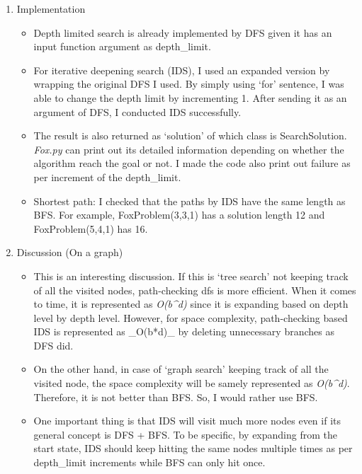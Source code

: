 \documentclass[]{article}
\providecommand{\tightlist}{%
  \setlength{\itemsep}{0pt}\setlength{\parskip}{0pt}}
\begin{document}
\begin{enumerate}
\def\labelenumi{\arabic{enumi}.}
\tightlist
\item
  Implementation

  \begin{itemize}
  \tightlist
  \item
    Depth limited search is already implemented by DFS given it has an
    input function argument as depth\_limit.
  \item
    For iterative deepening search (IDS), I used an expanded version by
    wrapping the original DFS I used. By simply using `for' sentence, I
    was able to change the depth limit by incrementing 1. After sending
    it as an argument of DFS, I conducted IDS successfully.
  \item
    The result is also returned as `solution' of which class is
    SearchSolution. \emph{Fox.py} can print out its detailed information
    depending on whether the algorithm reach the goal or not. I made the
    code also print out failure as per increment of the depth\_limit.
  \item
    Shortest path: I checked that the paths by IDS have the same length
    as BFS. For example, FoxProblem(3,3,1) has a solution length 12 and
    FoxProblem(5,4,1) has 16.
  \end{itemize}
\item
  Discussion (On a graph)

  \begin{itemize}
  \tightlist
  \item
    This is an interesting discussion. If this is `tree search' not
    keeping track of all the visited nodes, path-checking dfs is more
    efficient. When it comes to time, it is represented as
    \emph{O(b\^{}d)} since it is expanding based on depth level by depth
    level. However, for space complexity, path-checking based IDS is
    represented as \_O(b*d)\_ by deleting unnecessary branches as DFS
    did.
  \item
    On the other hand, in case of `graph search' keeping track of all
    the visited node, the space complexity will be samely represented as
    \emph{O(b\^{}d)}. Therefore, it is not better than BFS. So, I would
    rather use BFS.
  \item
    One important thing is that IDS will visit much more nodes even if
    its general concept is DFS + BFS. To be specific, by expanding from
    the start state, IDS should keep hitting the same nodes multiple
    times as per depth\_limit increments while BFS can only hit once.
  \end{itemize}
\end{enumerate}
\end{document}
